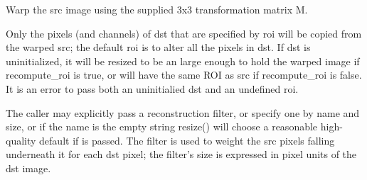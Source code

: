  

Warp the {\cf src} image using the supplied 3x3 transformation matrix {\cf M}.

Only the pixels (and channels) of {\cf dst} that are specified by {\cf roi}
will be copied from the warped {\cf src}; the default {\cf roi} is to alter
all the pixels in {\cf dst}. If {\cf dst} is uninitialized, it will be
resized to be an \ImageBuf large enough to hold the warped image if
{\cf recompute_roi} is {\cf true}, or will have the same ROI as {\cf src}
if {\cf recompute_roi} is false. It is an
error to pass both an uninitialied {\cf dst} and an undefined {\cf roi}.

The caller may explicitly pass a reconstruction filter, or specify one by
name and size, or if the name is the empty string {\cf resize()} will choose
a reasonable high-quality default if \NULL is passed.  The filter is used to
weight the {\cf src} pixels falling underneath it for each {\cf dst} pixel;
the filter's size is expressed in pixel units of the {\cf dst} image.


